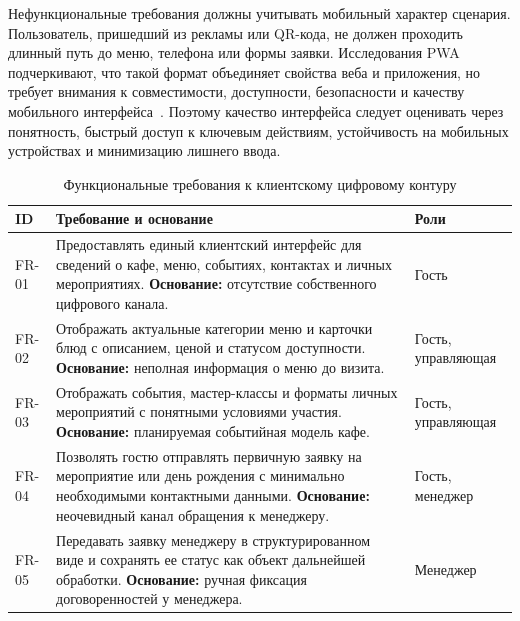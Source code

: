 Нефункциональные требования должны учитывать мобильный характер сценария. Пользователь, пришедший из рекламы или QR-кода, не должен проходить длинный путь до меню, телефона или формы заявки. Исследования PWA подчеркивают, что такой формат объединяет свойства веба и приложения, но требует внимания к совместимости, доступности, безопасности и качеству мобильного интерфейса~\cite{fauzan2022,pwa_implementation_2024}. Поэтому качество интерфейса следует оценивать через понятность, быстрый доступ к ключевым действиям, устойчивость на мобильных устройствах и минимизацию лишнего ввода.

\begin{table}[H]
\centering
\footnotesize
\caption{Функциональные требования к клиентскому цифровому контуру}
\label{tab:v2_functional_requirements}
\setlength{\tabcolsep}{4pt}
\begin{tabularx}{\textwidth}{|>{\raggedright\arraybackslash}p{}|>{\raggedright\arraybackslash}p{}|>{\raggedright\arraybackslash}X|}
\hline
\textbf{ID} & \textbf{Требование и основание} & \textbf{Роли} \\ \hline
FR-01 & Предоставлять единый клиентский интерфейс для сведений о кафе, меню, событиях, контактах и личных мероприятиях. \newline \textbf{Основание:} отсутствие собственного цифрового канала. & Гость \\ \hline
FR-02 & Отображать актуальные категории меню и карточки блюд с описанием, ценой и статусом доступности. \newline \textbf{Основание:} неполная информация о меню до визита. & Гость, управляющая \\ \hline
FR-03 & Отображать события, мастер-классы и форматы личных мероприятий с понятными условиями участия. \newline \textbf{Основание:} планируемая событийная модель кафе. & Гость, управляющая \\ \hline
FR-04 & Позволять гостю отправлять первичную заявку на мероприятие или день рождения с минимально необходимыми контактными данными. \newline \textbf{Основание:} неочевидный канал обращения к менеджеру. & Гость, менеджер \\ \hline
FR-05 & Передавать заявку менеджеру в структурированном виде и сохранять ее статус как объект дальнейшей обработки. \newline \textbf{Основание:} ручная фиксация договоренностей у менеджера. & Менеджер \\ \hline

\end{tabularx}
\end{table}
